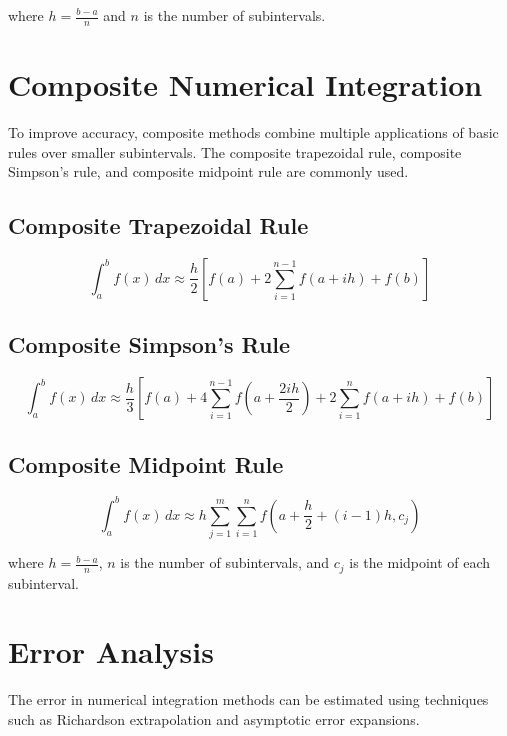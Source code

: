 \documentclass{article}
\begin{document}
where $h = \frac{b - a}{n}$ and $n$ is the number of subintervals.

\section{Composite Numerical Integration}

To improve accuracy, composite methods combine multiple applications of basic rules over smaller subintervals. The composite trapezoidal rule, composite Simpson's rule, and composite midpoint rule are commonly used.

\subsection{Composite Trapezoidal Rule}

\begin{equation}
    \int_{a}^{b} f(x) \,dx \approx \frac{h}{2} \left[f(a) + 2\sum_{i=1}^{n-1} f(a + ih) + f(b)\right]
\end{equation}

\subsection{Composite Simpson's Rule}

\begin{equation}
    \int_{a}^{b} f(x) \,dx \approx \frac{h}{3} \left[f(a) + 4\sum_{i=1}^{n-1} f\left(a + \frac{2ih}{2}\right) + 2\sum_{i=1}^{n} f(a + ih) + f(b)\right]
\end{equation}

\subsection{Composite Midpoint Rule}

\begin{equation}
    \int_{a}^{b} f(x) \,dx \approx h \sum_{j=1}^{m} \sum_{i=1}^{n} f\left(a + \frac{h}{2} + (i-1)h, c_j\right)
\end{equation}

where $h = \frac{b - a}{n}$, $n$ is the number of subintervals, and $c_j$ is the midpoint of each subinterval.

\section{Error Analysis}

The error in numerical integration methods can be estimated using techniques such as Richardson extrapolation and asymptotic error expansions.
\end{document}

